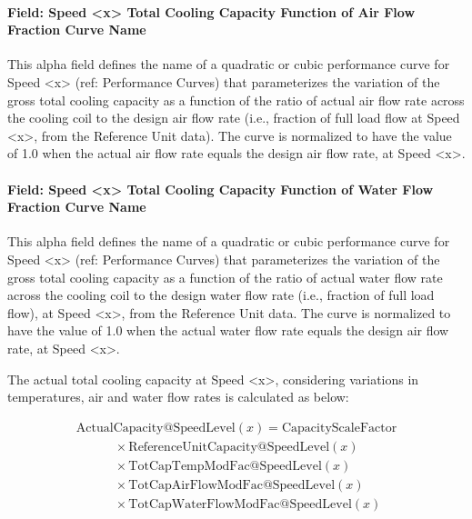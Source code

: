 \paragraph{Field: Speed \textless{}x\textgreater{} Total Cooling Capacity Function of Air Flow Fraction Curve Name}\label{field-speed-x-total-cooling-capacity-function-of-air-flow-fraction-curve-name-1}

This alpha field defines the name of a quadratic or cubic performance curve for Speed \textless{}x\textgreater{} (ref: Performance Curves) that parameterizes the variation of the gross total cooling capacity as a function of the ratio of actual air flow rate across the cooling coil to the design air flow rate (i.e., fraction of full load flow at Speed \textless{}x\textgreater{}, from the Reference Unit data). The curve is normalized to have the value of 1.0 when the actual air flow rate equals the design air flow rate, at Speed \textless{}x\textgreater{}.

\paragraph{Field: Speed \textless{}x\textgreater{} Total Cooling Capacity Function of Water Flow Fraction Curve Name}\label{field-speed-x-total-cooling-capacity-function-of-water-flow-fraction-curve-name}

This alpha field defines the name of a quadratic or cubic performance curve for Speed \textless{}x\textgreater{} (ref: Performance Curves) that parameterizes the variation of the gross total cooling capacity as a function of the ratio of actual water flow rate across the cooling coil to the design water flow rate (i.e., fraction of full load flow), at Speed \textless{}x\textgreater{}, from the Reference Unit data. The curve is normalized to have the value of 1.0 when the actual water flow rate equals the design air flow rate, at Speed \textless{}x\textgreater{}.

The actual total cooling capacity at Speed \textless{}x\textgreater{}, considering variations in temperatures, air and water flow rates is calculated as below:

\begin{equation}
  \begin{array}{l}
    \mathrm{ActualCapacity} @ \mathrm{SpeedLevel} \left( x \right) = \mathrm{CapacityScaleFactor} \\
    \quad \quad \quad \times \mathrm{ReferenceUnitCapacity} @ \mathrm{SpeedLevel}(x) \\
    \quad \quad \quad \times \mathrm{TotCapTempModFac} @ \mathrm{SpeedLevel}(x) \\
    \quad \quad \quad \times \mathrm{TotCapAirFlowModFac} @ \mathrm{SpeedLevel}(x) \\
    \quad \quad \quad \times \mathrm{TotCapWaterFlowModFac} @ \mathrm{SpeedLevel}(x)
  \end{array}
\end{equation}

